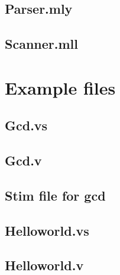 \documentclass[letterpaper,11pt]{article}
\begin{document}
\subsection{Parser.mly}

\subsection{Scanner.mll}


\section{Example files}
\subsection{Gcd.vs}

\subsection{Gcd.v}

\subsection{Stim file for gcd}

\subsection{Helloworld.vs}

\subsection{Helloworld.v}

\end{document}
